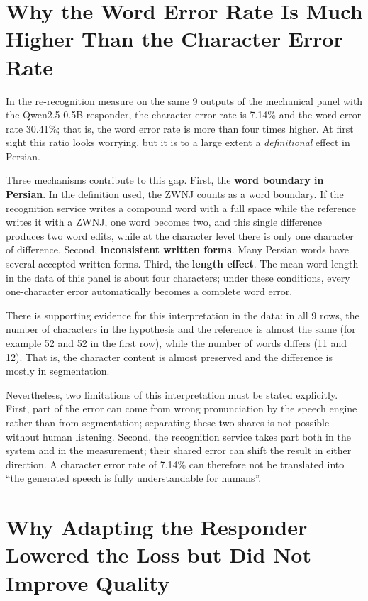 \section{Why the Word Error Rate Is Much Higher Than the Character Error Rate}
\label{sec:disc-cer-wer}

In the re-recognition measure on the same 9 outputs of the mechanical panel with the
Qwen2.5-0.5B responder, the character error rate is 7.14\% and the word error rate 30.41\%; that
is, the word error rate is more than four times higher. At first sight this ratio looks
worrying, but it is to a large extent a \emph{definitional} effect in Persian.

Three mechanisms contribute to this gap. First, the \textbf{word boundary in Persian}. In the
definition used, the ZWNJ counts as a word boundary. If the recognition service writes a
compound word with a full space while the reference writes it with a ZWNJ, one word becomes two,
and this single difference produces two word edits, while at the character level there is only
one character of difference. Second, \textbf{inconsistent written forms}. Many Persian words
have several accepted written forms. Third, the \textbf{length effect}. The mean word length in
the data of this panel is about four characters; under these conditions, every one-character
error automatically becomes a complete word error.

There is supporting evidence for this interpretation in the data: in all 9 rows, the number of
characters in the hypothesis and the reference is almost the same (for example 52 and 52 in the
first row), while the number of words differs (11 and 12). That is, the character content is
almost preserved and the difference is mostly in segmentation.

Nevertheless, two limitations of this interpretation must be stated explicitly. First, part of
the error can come from wrong pronunciation by the speech engine rather than from
segmentation; separating these two shares is not possible without human listening. Second, the
recognition service takes part both in the system and in the measurement; their shared error can
shift the result in either direction. A character error rate of 7.14\% can therefore not be
translated into ``the generated speech is fully understandable for humans''.

\section{Why Adapting the Responder Lowered the Loss but Did Not Improve Quality}
\label{sec:disc-reference}

